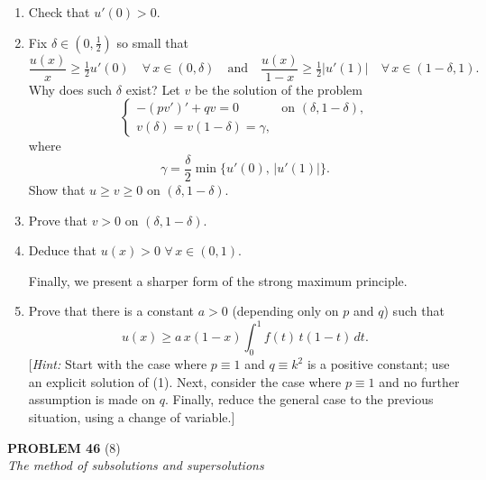 \documentclass[12pt]{article}
\newcommand{\abs}[1]{\left|#1\right|}
\begin{document}
\begin{enumerate}
\item Check that $u'(0) > 0$.
 
 
\item Fix $\delta \in (0, \tfrac{1}{2})$ so small that
\[
\frac{u(x)}{x} \ge \tfrac{1}{2}u'(0) \quad \forall\, x \in (0,\delta)
\quad \text{and} \quad
\frac{u(x)}{1-x} \ge \tfrac{1}{2}\abs{u'(1)} \quad \forall\, x \in (1-\delta, 1).
\]
Why does such $\delta$ exist? Let $v$ be the solution of the problem
\[
\begin{cases}
-(pv')' + qv = 0 & \text{on } (\delta, 1-\delta),\\
v(\delta) = v(1-\delta) = \gamma,
\end{cases}
\]
where
\[
\gamma = \frac{\delta}{2}\min\{u'(0),\, \abs{u'(1)}\}.
\]
Show that $u \ge v \ge 0$ on $(\delta, 1-\delta)$.
 
\item Prove that $v > 0$ on $(\delta, 1-\delta)$.
 
\noindent[\textit{Hint:} Assume by contradiction that $v(x_0) = 0$ for some $x_0 \in (\delta, 1-\delta)$,
and apply Theorem 7.3 (Cauchy--Lipschitz--Picard) as in Exercise 8.33.]
 
\item Deduce that $u(x) > 0$ $\forall\, x \in (0,1)$.
 
Finally, we present a sharper form of the strong maximum principle.
 
\item Prove that there is a constant $a > 0$ (depending only on $p$ and $q$) such that
\[
u(x) \ge a\,x(1-x)\int_0^1 f(t)\,t(1-t)\,dt.
\]
[\textit{Hint:} Start with the case where $p \equiv 1$ and $q \equiv k^2$ is a positive constant;
use an explicit solution of (1). Next, consider the case where $p \equiv 1$ and no
further assumption is made on $q$. Finally, reduce the general case to the previous
situation, using a change of variable.]
\end{enumerate}
 
\bigskip
 
\noindent\textbf{PROBLEM 46} (8)\\[4pt]
\textit{The method of subsolutions and supersolutions}
 
\medskip
 
\end{document}
